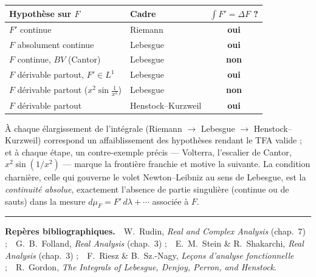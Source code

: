\documentclass[11pt]{article}
\theoremstyle{thmblue}
\theoremstyle{defplain}
\theoremstyle{rem}
\begin{document}
\begin{center}
\renewcommand{\arraystretch}{1.35}
\begin{tabular}{@{}>{\raggedright}p{5.0cm} >{\raggedright}p{4.3cm} c@{}}
\toprule
\textbf{Hypothèse sur $F$} & \textbf{Cadre} & $\int F'=\Delta F$ ? \\
\midrule
$F'$ continue & Riemann & \textbf{oui} \\
$F$ absolument continue & Lebesgue & \textbf{oui} \\
$F$ continue, $BV$ (Cantor) & Lebesgue & \textbf{non} \\
$F$ dérivable partout, $F'\in L^1$ & Lebesgue & \textbf{oui} \\
$F$ dérivable partout ($x^2\sin\frac1{x^2}$) & Lebesgue & \textbf{non} \\
$F$ dérivable partout & Henstock--Kurzweil & \textbf{oui} \\
\bottomrule
\end{tabular}
\end{center}

\medskip
\noindent
À chaque élargissement de l'intégrale (Riemann $\to$ Lebesgue $\to$ Henstock--Kurzweil) correspond un
affaiblissement des hypothèses rendant le TFA valide ; et à chaque étape, un contre-exemple précis ---
Volterra, l'escalier de Cantor, $x^2\sin(1/x^2)$ --- marque la frontière franchie et motive la
suivante. La condition charnière, celle qui gouverne le volet Newton--Leibniz au sens de Lebesgue,
est la \emph{continuité absolue}, exactement l'absence de partie singulière (continue ou de sauts) dans
la mesure $d\mu_F=F'\,d\lambda+\cdots$ associée à $F$.

\vspace{0.4cm}
\hrule
\vspace{0.3cm}
\noindent\textbf{\color{NavyBlue}Repères bibliographiques.}\ \
W.~Rudin, \emph{Real and Complex Analysis} (chap.~7) ;\ \
G.~B.~Folland, \emph{Real Analysis} (chap.~3) ;\ \
E.~M.~Stein \& R.~Shakarchi, \emph{Real Analysis} (chap.~3) ;\ \
F.~Riesz \& B.~Sz.-Nagy, \emph{Le\c{c}ons d'analyse fonctionnelle} ;\ \
R.~Gordon, \emph{The Integrals of Lebesgue, Denjoy, Perron, and Henstock}.
\end{document}
